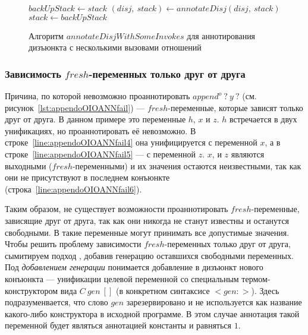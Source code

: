 \begin{figure}[h!]
  \begin{center}
  \begin{minipage}{1\textwidth}
\begin{algorithm}[H]
  $backUpStack \gets stack$\;
   {
    $(disj,~stack) \gets annotateDisj(disj,~stack)$\;
     {
    } {
      $stack \gets backUpStack$
    }
  }
\end{algorithm}
  \end{minipage}
  \end{center}
  \caption{Алгоритм $annotateDisjWithSomeInvokes$ для аннотирования дизъюнкта с несколькими вызовами отношений}
  \label{alg:annotateDisjWithSomeInvokes}
\end{figure}


\subsubsection{Зависимость $fresh$-переменных только друг от друга}
\label{lab:gen}

Причина, по которой невозможно проаннотировать $append^o \ ? \ y \ ?$ (см. рисунок~\ref{lst:appendoOIOANNfail}) --- $fresh$-переменные, которые зависят только друг от друга.
В данном примере это переменные $h$, $x$ и $z$.
$h$ встречается в двух унификациях, но проаннотировать её невозможно.
В строке~\ref{line:appendoOIOANNfail4} она унифицируется с переменной $x$, а в строке~\ref{line:appendoOIOANNfail5} --- с переменной $z$.
$x$, и $z$ являются выходными ($fresh$-переменными) и их значения остаются неизвестными, так как они не присутствуют в последнем конъюнкте (строка~\ref{line:appendoOIOANNfail6}).

Таким образом, не существует возможности проаннотировать $fresh$-переменные, зависящие друг от друга, так как они никогда не станут известны и останутся свободными.
В \miniKanren{} такие переменные могут принимать все допустимые значения.
Чтобы решить проблему зависимости $fresh$-переменных только друг от друга, сымитируем подход \miniKanren{}, добавив генерацию оставшихся свободными переменных.
Под \emph{добавлением генерации} понимается добавление в дизъюнкт нового конъюнкта --- унификации целевой переменной со специальным термом-конструктором вида $C~gen~[]$ (в конкретном синтаксисе $<gen:>$).
Здесь подразуменвается, что слово $gen$ зарезервировано и не используется как название какого-либо конструктора в исходной программе.
В этом случае аннотация такой переменной будет являться аннотацией константы и равняться $1$.


